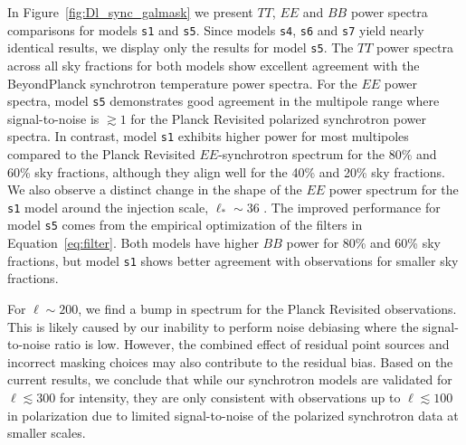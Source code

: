 \documentclass[twocolumn]{aastex631}
\begin{document}
In Figure~\ref{fig:Dl_sync_galmask} we present $TT$, $EE$ and $BB$ power spectra comparisons for models \texttt{s1} and \texttt{s5}. Since models \texttt{s4}, \texttt{s6} and \texttt{s7} yield nearly identical results, we display only the results for model \texttt{s5}. The $TT$ power spectra across all sky fractions for both models show excellent agreement with the BeyondPlanck synchrotron temperature power spectra. For the $EE$ power spectra, model \texttt{s5} demonstrates good agreement in the multipole range where signal-to-noise is $\gtrsim 1$ for the Planck Revisited polarized synchrotron power spectra. In contrast, model \texttt{s1} exhibits higher power for most multipoles compared to the Planck Revisited $EE$-synchrotron spectrum for the 80\% and 60\% sky fractions, although they align well for the 40\% and 20\% sky fractions. We also observe a distinct change in the shape of the $EE$ power spectrum for the \texttt{s1} model around the injection scale, $\ell_*\sim 36$ \citep{Thorne:2017}. The improved performance for model \texttt{s5} comes from the empirical optimization of the filters in Equation~\eqref{eq:filter}. Both models have higher $BB$ power for 80\% and 60\% sky fractions, but model \texttt{s1} shows better agreement with observations for smaller sky fractions.

For $\ell \sim 200$, we find a bump in spectrum for the Planck Revisited observations. This is likely caused by our inability to perform noise debiasing where the signal-to-noise ratio is low. However, the combined effect of residual point sources and incorrect masking choices may also contribute to the residual bias. Based on the current results, we conclude that while our synchrotron models are validated for $\ell \lesssim 300$ for intensity, they are only consistent with observations up to $\ell \lesssim 100$ in polarization due to limited signal-to-noise of the polarized synchrotron data at smaller scales.
\end{document}
